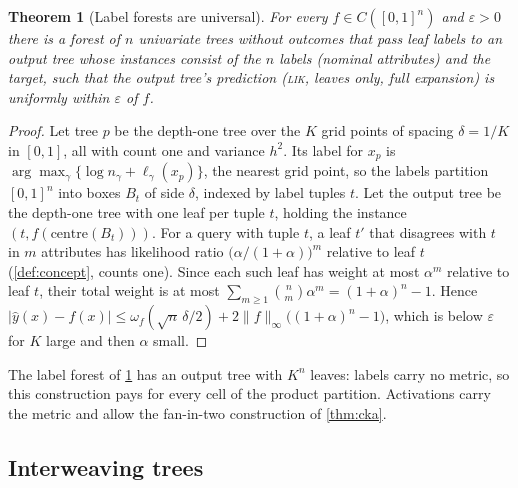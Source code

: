 \documentclass[11pt]{article}
\newtheorem{theorem}{Theorem}
\theoremstyle{definition}
\theoremstyle{remark}
\newcommand{\hy}{\hat{y}}
\begin{document}
\begin{theorem}[Label forests are universal]\label{thm:label}
For every $f\in C([0,1]^n)$ and $\varepsilon>0$ there is a forest of $n$ univariate trees
without outcomes that pass leaf labels to an output tree whose instances consist of the
$n$ labels (nominal attributes) and the target, such that the output tree's prediction
(\textsc{lik}, leaves only, full expansion) is uniformly within $\varepsilon$ of $f$.
\end{theorem}
\begin{proof}
Let tree $p$ be the depth-one tree over the $K$ grid points of spacing $\delta=1/K$ in
$[0,1]$, all with count one and variance $h^2$.  Its label for $x_p$ is
$\arg\max_\gamma\{\log n_\gamma+\ell_\gamma(x_p)\}$, the nearest grid point, so the
labels partition $[0,1]^n$ into boxes $B_t$ of side $\delta$, indexed by label tuples
$t$.  Let the output tree be the depth-one tree with one leaf per tuple $t$, holding the
instance $(t,f(\text{centre}(B_t)))$.  For a query with tuple $t$, a leaf $t'$ that
disagrees with $t$ in $m$ attributes has likelihood ratio $\bigl(\alpha/(1+\alpha)\bigr)^m$
relative to leaf $t$ (\cref{def:concept}, counts one).  Since each such leaf has weight at most $\alpha^m$ relative to leaf $t$, their total
weight is at most $\sum_{m\ge1}\binom nm\alpha^m=(1+\alpha)^n-1$.  Hence
$|\hy(x)-f(x)|\le\omega_f(\sqrt n\,\delta/2)+2\|f\|_\infty\bigl((1+\alpha)^n-1\bigr)$,
which is below $\varepsilon$ for $K$ large and then $\alpha$ small.
\end{proof}

The label forest of \cref{thm:label} has an output tree with $K^n$ leaves: labels carry
no metric, so this construction pays for every cell of the product partition.
Activations carry the metric and allow the fan-in-two construction of \cref{thm:cka}.

\subsection{Interweaving trees}
\end{document}
